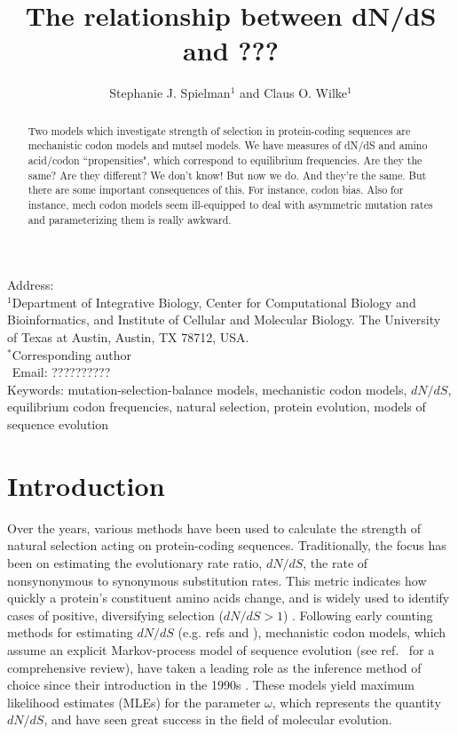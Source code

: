 \documentclass[11pt]{article}
\begin{document}
\title{\textbf{The relationship between dN/dS and ???}}
\author{Stephanie J. Spielman$^{1}$ and Claus O. Wilke$^{1}$}
\date{}

\maketitle
\noindent
Address:\\
$^1$Department of Integrative Biology, Center for Computational Biology and Bioinformatics, and Institute of Cellular and Molecular Biology.
The University of Texas at Austin, Austin, TX 78712, USA.\\

\bigskip
\noindent
$^*$Corresponding author\\
$\phantom{^*}$Email: ??????????\\

\bigskip
\noindent Keywords: mutation-selection-balance models, mechanistic codon models, $dN/dS$, equilibrium codon frequencies, natural selection, protein evolution, models of sequence evolution

\newpage
\begin{abstract}
Two models which investigate strength of selection in protein-coding sequences are mechanistic codon models and mutsel models. We have measures of dN/dS and amino acid/codon ``propensities", which correspond to equilibrium frequencies. Are they the same? Are they different? We don't know! But now we do. And they're the same. But there are some important consequences of this. For instance, codon bias. Also for instance, mech codon models seem ill-equipped to deal with asymmetric mutation rates and parameterizing them is really awkward.
  
\end{abstract}


\section*{Introduction}

Over the years, various methods have been used to calculate the strength of natural selection acting on protein-coding sequences. Traditionally, the focus has been on estimating the evolutionary rate ratio, $dN/dS$, the rate of nonsynonymous to synonymous substitution rates. This metric indicates how quickly a protein's constituent amino acids change, and is widely used to identify cases of positive, diversifying selection ($dN/dS > 1$) \cite{NielsenYang1998, Yangetal2000, KosakovskyPondFrost2005, Huelsenbecketal2006}. Following early counting methods for estimating $dN/dS$ (e.g. refs \cite{LWL85} and \cite{NG86}), mechanistic codon models, which assume an explicit Markov-process model of sequence evolution (see ref.~\cite{Anisimova2009} for a comprehensive review), have taken a leading role as the inference method of choice since their introduction in the 1990s \cite{GoldmanYang1994, MuseGaut1994, NielsenYang1998}. These models yield maximum likelihood estimates (MLEs) for the parameter $\omega$, which represents the quantity $dN/dS$, and have seen great success in the field of molecular evolution. 
\end{document}

